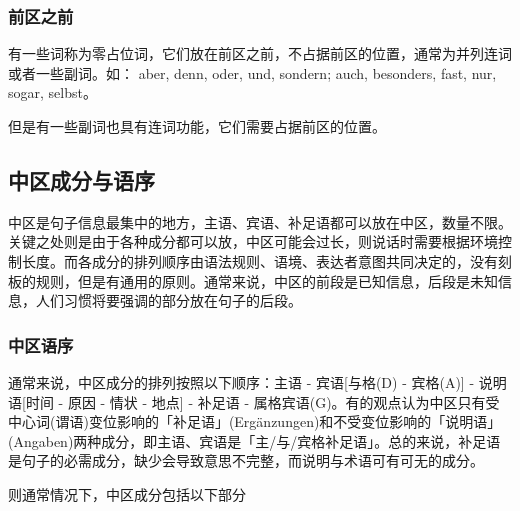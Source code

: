 \subsubsection{前区之前}
有一些词称为零占位词，它们放在前区之前，不占据前区的位置，通常为并列连词或者一些副词。如： aber, denn, oder, und, sondern; auch, besonders, fast, nur, sogar, selbst。


但是有一些副词也具有连词功能，它们需要占据前区的位置。


\subsection{中区成分与语序}
中区是句子信息最集中的地方，主语、宾语、补足语都可以放在中区，数量不限。关键之处则是由于各种成分都可以放，中区可能会过长，则说话时需要根据环境控制长度。而各成分的排列顺序由语法规则、语境、表达者意图共同决定的，没有刻板的规则，但是有通用的原则。通常来说，中区的前段是已知信息，后段是未知信息，人们习惯将要强调的部分放在句子的后段。

\subsubsection{中区语序}
通常来说，中区成分的排列按照以下顺序：主语 - 宾语[与格(D) - 宾格(A)] - 说明语[时间 - 原因 - 情状 - 地点] - 补足语 - 属格宾语(G)。有的观点认为中区只有受中心词(谓语)变位影响的「补足语」(Ergänzungen)和不受变位影响的「说明语」(Angaben)两种成分，即主语、宾语是「主/与/宾格补足语」。总的来说，补足语是句子的必需成分，缺少会导致意思不完整，而说明与术语可有可无的成分。

则通常情况下，中区成分包括以下部分


